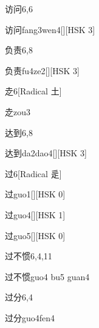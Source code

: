 \begin{entry}{访问}{6,6}
  \begin{phonetics}{访问}{fang3wen4}[][HSK 3]
  \end{phonetics}
\end{entry}

\begin{entry}{负责}{6,8}
  \begin{phonetics}{负责}{fu4ze2}[][HSK 3]
  \end{phonetics}
\end{entry}

\begin{entry}{赱}{6}[Radical 土]
  \begin{phonetics}{赱}{zou3}
  \end{phonetics}
\end{entry}

\begin{entry}{达到}{6,8}
  \begin{phonetics}{达到}{da2dao4}[][HSK 3]
  \end{phonetics}
\end{entry}

\begin{entry}{过}{6}[Radical 辵]
  \begin{phonetics}{过}{guo1}[][HSK 0]
  \end{phonetics}
  \begin{phonetics}{过}{guo4}[][HSK 1]
  \end{phonetics}
  \begin{phonetics}{过}{guo5}[][HSK 0]
  \end{phonetics}
\end{entry}

\begin{entry}{过不惯}{6,4,11}
  \begin{phonetics}{过不惯}{guo4 bu5 guan4}
  \end{phonetics}
\end{entry}

\begin{entry}{过分}{6,4}
  \begin{phonetics}{过分}{guo4fen4}
  \end{phonetics}
\end{entry}

